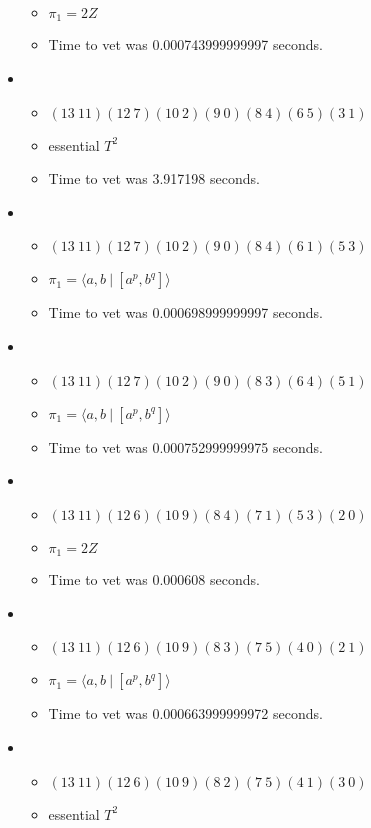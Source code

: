 \documentclass{article}
\begin{document}
\begin{itemize}
\begin{itemize}
      \item $\pi_1 =2 Z$
      \item Time to vet was 0.000743999999997 seconds.
\end{itemize}
\item \begin{itemize}
      \item $(13\ 11)(12\ 7)(10\ 2)(9\ 0)(8\ 4)(6\ 5)(3\ 1)$
      \item essential $T^2$
      \item Time to vet was 3.917198 seconds.
\end{itemize}
\item \begin{itemize}
      \item $(13\ 11)(12\ 7)(10\ 2)(9\ 0)(8\ 4)(6\ 1)(5\ 3)$
      \item $\pi_1 = \langle a,b\ |\ [a^p,b^q]\rangle$
      \item Time to vet was 0.000698999999997 seconds.
\end{itemize}
\item \begin{itemize}
      \item $(13\ 11)(12\ 7)(10\ 2)(9\ 0)(8\ 3)(6\ 4)(5\ 1)$
      \item $\pi_1 = \langle a,b\ |\ [a^p,b^q]\rangle$
      \item Time to vet was 0.000752999999975 seconds.
\end{itemize}
\item \begin{itemize}
      \item $(13\ 11)(12\ 6)(10\ 9)(8\ 4)(7\ 1)(5\ 3)(2\ 0)$
      \item $\pi_1 =2 Z$
      \item Time to vet was 0.000608 seconds.
\end{itemize}
\item \begin{itemize}
      \item $(13\ 11)(12\ 6)(10\ 9)(8\ 3)(7\ 5)(4\ 0)(2\ 1)$
      \item $\pi_1 = \langle a,b\ |\ [a^p,b^q]\rangle$
      \item Time to vet was 0.000663999999972 seconds.
\end{itemize}
\item \begin{itemize}
      \item $(13\ 11)(12\ 6)(10\ 9)(8\ 2)(7\ 5)(4\ 1)(3\ 0)$
      \item essential $T^2$

\end{itemize}
\end{itemize}
\end{document}
